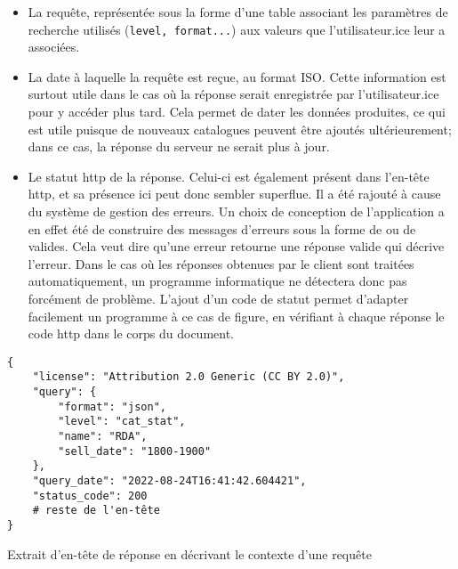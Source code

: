 \begin{itemize}
	\item La requête, représentée sous la forme d'une table associant les paramètres de recherche utilisés (\texttt{level, format...}) aux valeurs que l'utilisateur.ice leur a associées.
	\item La date à laquelle la requête est reçue, au format ISO. Cette information est surtout utile dans le cas où la réponse serait enregistrée par l'utilisateur.ice pour y accéder plus tard. Cela permet de dater les données produites, ce qui est utile puisque de nouveaux catalogues peuvent être ajoutés ultérieurement; dans ce cas, la réponse du serveur ne serait plus à jour.
	\item Le statut \gls{http} de la réponse. Celui-ci est également présent dans l'en-tête \gls{http}, et sa présence ici peut donc sembler superflue. Il a été rajouté à cause du système de gestion des erreurs. Un choix de conception de l'application a en effet été de construire des messages d'erreurs sous la forme de \json{} ou de \tei{} valides. Cela veut dire qu'une erreur retourne une réponse valide qui décrive l'erreur. Dans le cas où les réponses obtenues par le client sont traitées automatiquement, un programme informatique ne détectera donc pas forcément de problème. L'ajout d'un code de statut permet d'adapter facilement un programme à ce cas de figure, en vérifiant à chaque réponse le code \gls{http} dans le corps du document.
\end{itemize}

\begin{listing}
	\begin{verbatim}
{
	"license": "Attribution 2.0 Generic (CC BY 2.0)",
	"query": {
		"format": "json",
		"level": "cat_stat",
		"name": "RDA",
		"sell_date": "1800-1900"
	},
	"query_date": "2022-08-24T16:41:42.604421",
	"status_code": 200
	# reste de l'en-tête
}
	\end{verbatim}
	\caption{Extrait d'en-tête de réponse en \json{} décrivant le contexte d'une requête}
	\label{code:api_header_context_json}
\end{listing}

